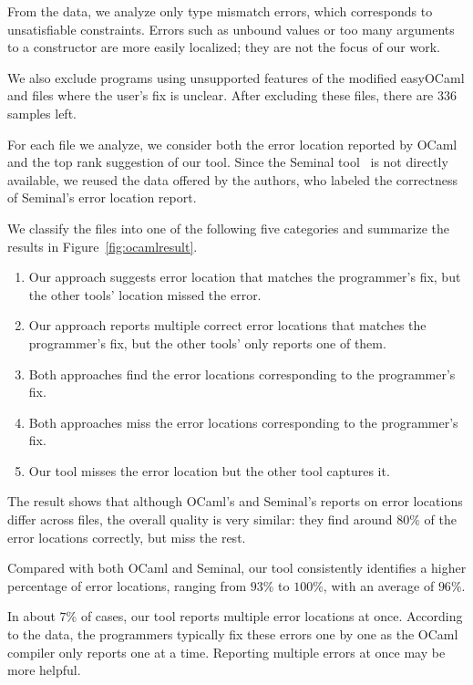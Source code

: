 From the data, we analyze only type mismatch errors, which corresponds
to unsatisfiable constraints. Errors such as unbound values or too many
arguments to a constructor are more easily localized; they are
not the focus of our work. 

We also exclude programs using unsupported features of the modified
easyOCaml and files where the user's fix is unclear. After excluding
these files, there are 336 samples left.

For each file we analyze, we consider both the error location reported
by OCaml and the top rank suggestion of our tool. Since the Seminal
tool~\cite{lerner:pldi07} is not directly available, we reused the data
offered by the authors, who labeled the correctness of Seminal's error
location report.

We classify the files into one of the following five
categories and summarize the results in Figure~\ref{fig:ocamlresult}.

\begin{enumerate}
\item Our approach suggests error location that matches the programmer's
fix, but the other tools' location missed the error.

\item Our approach reports multiple correct error locations that
matches the programmer's fix, but the other tools' only reports one of
them.

\item Both approaches find the error locations corresponding to
the programmer's fix.

\item Both approaches miss the error locations corresponding to
the programmer's fix.

\item Our tool misses the error location but the other tool captures
it.
\end{enumerate}

The result shows that although OCaml's and Seminal's reports on error
locations differ across files, the overall quality is very similar:
they find around $80\%$ of the error locations correctly, but miss the
rest. 

Compared with both OCaml and Seminal, our tool consistently identifies
a higher percentage of error locations,
ranging from $93\%$ to $100\%$, with an average of $96\%$.

In about $7\%$ of
cases, our tool reports multiple error locations at once.
According to the data, the programmers typically fix these errors one
by one as the OCaml compiler only reports one at a time.
Reporting multiple errors at once may be more helpful.

